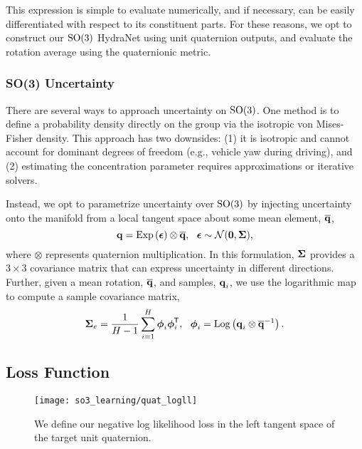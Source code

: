 This expression is simple to evaluate numerically, and if necessary, can be easily differentiated with respect to its constituent parts. For these reasons, we opt to construct our $\mathrm{SO}(3)$ HydraNet using unit quaternion outputs, and evaluate the rotation average using the quaternionic metric.



\subsubsection{SO(3) Uncertainty}

There are several ways to approach uncertainty on $\mathrm{SO}(3)$. One method \citep{Carlone2015-aq} is to define a probability density directly on the group via the isotropic von Mises-Fisher density. This approach has two downsides: (1) it is isotropic and cannot account for dominant  degrees of freedom (e.g., vehicle yaw during driving), and (2) estimating the concentration parameter requires approximations or iterative solvers.

Instead, we opt to parametrize uncertainty over $\mathrm{SO}(3)$ by injecting uncertainty onto the manifold \citep{Forster2015-af,Barfoot2014-ac,Barfoot2017-ri} from a local tangent space about some mean element, $\overline{\boldsymbol{\mathbf{q}}}$,
\begin{equation}
\label{eq:quat_inject_density}
\boldsymbol{\mathbf{q}} = \mathrm{Exp}\left({\boldsymbol{\mathbf{\epsilon}}}\right) \otimes \overline{\boldsymbol{\mathbf{q}}}, ~~ \boldsymbol{\mathbf{\epsilon}} \sim \mathcal{N}(\boldsymbol{\mathbf{0}}, \boldsymbol{\mathbf{\Sigma}}),
\end{equation}
 \noindent where $\otimes$ represents quaternion multiplication. In this formulation, $\boldsymbol{\mathbf{\Sigma}}$ provides a $3\times 3$ covariance matrix that can express uncertainty in different directions. Further, given a mean rotation, $\overline{\boldsymbol{\mathbf{q}}}$, and samples, $\boldsymbol{\mathbf{q}}_i$, we use the logarithmic map to compute a sample covariance matrix,\begin{equation}
\label{eq:head_covariance}
\boldsymbol{\mathbf{\Sigma}}_e = \frac{1}{H-1} \sum_{i=1}^H  \boldsymbol{\mathbf{\phi}}_i \boldsymbol{\mathbf{\phi}}_i^{\mkern-1.0mu\mathsf{T}}, ~~ \boldsymbol{\mathbf{\phi}}_i = \mathrm{Log}\left({\boldsymbol{\mathbf{q}}_i \otimes \overline{\boldsymbol{\mathbf{q}}}^{-1}}\right).
\end{equation}


\subsection{Loss Function}

\begin{wrapfigure}{r}{0.35\textwidth}
  \vspace{-20pt}
  \begin{center}
	\texttt{[image: so3\_learning/quat\_logll]}
  \end{center}
    \vspace{-20pt}
	\label{fig:math_quat_uncertainty}
	\caption{We define our negative log likelihood loss in the left tangent space of the target unit quaternion.}
\end{wrapfigure} 

